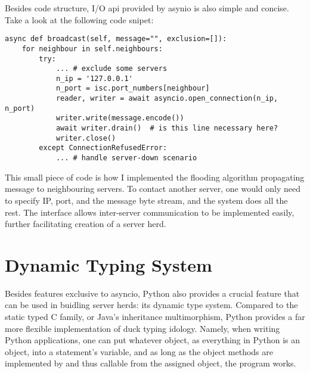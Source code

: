 \documentclass[letterpaper,twocolumn,10pt]{article}
\begin{document}
Besides code structure, I/O api provided by asynio is also simple and concise.
Take a look at the following code snipet:
\begin{lstlisting}[breaklines=true]
async def broadcast(self, message="", exclusion=[]):
    for neighbour in self.neighbours:
        try:
            ... # exclude some servers
            n_ip = '127.0.0.1'
            n_port = isc.port_numbers[neighbour]
            reader, writer = await asyncio.open_connection(n_ip, n_port)
            writer.write(message.encode())
            await writer.drain()  # is this line necessary here?
            writer.close()
        except ConnectionRefusedError: 
            ... # handle server-down scenario
\end{lstlisting}
This small piece of code is how I implemented the flooding algorithm propagating message to neighbouring servers.
To contact another server, one would only need to specify IP, port, and the message byte stream, and the system does all the rest.
The interface allows inter-server communication to be implemented easily, further facilitating creation of a server herd.

\section{Dynamic Typing System}

Besides features exclusive to asyncio, Python also provides a crucial feature that can be used in buidling server herds: its dynamic type system.
Compared to the static typed C family, or Java's inheritance multimorphism, Python provides a far more flexible implementation of duck typing idology.
Namely, when writing Python applications, one can put whatever object, as everything in Python is an object, into a statement's variable, and as long as the object methods are implemented by and thus callable from the assigned object, the program works.
\end{document}

